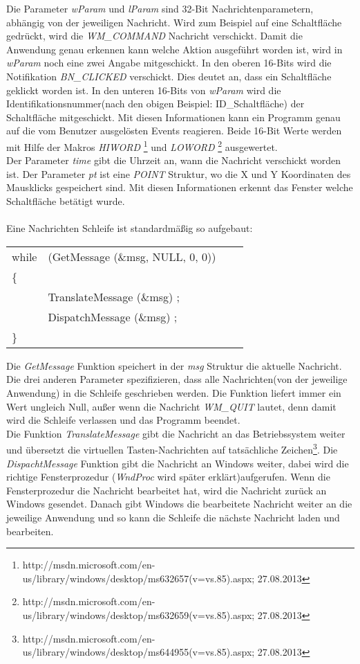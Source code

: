 Die Parameter \textit{wParam} und \textit{lParam} sind 32-Bit Nachrichtenparametern, abhängig von der jeweiligen Nachricht. Wird zum Beispiel auf eine Schaltfläche gedrückt, wird die \textit{WM\_COMMAND} Nachricht verschickt. Damit die Anwendung genau erkennen kann welche Aktion ausgeführt worden ist, wird in \textit{wParam} noch eine zwei Angabe mitgeschickt. In den oberen 16-Bits wird die Notifikation \textit{BN\_CLICKED} verschickt. Dies deutet an, dass ein Schaltfläche geklickt worden ist. In den unteren 16-Bits von \textit{wParam} wird die Identifikationsnummer(nach den obigen Beispiel: ID\_Schaltfläche) der Schaltfläche mitgeschickt. Mit diesen Informationen kann ein Programm genau auf die vom Benutzer ausgelösten Events reagieren. Beide 16-Bit Werte werden mit Hilfe der Makros \textit{HIWORD} \footnote{http://msdn.microsoft.com/en-us/library/windows/desktop/ms632657(v=vs.85).aspx; 27.08.2013} und \textit{LOWORD} \footnote{http://msdn.microsoft.com/en-us/library/windows/desktop/ms632659(v=vs.85).aspx; 27.08.2013} ausgewertet.\\

Der Parameter \textit{time} gibt die Uhrzeit an, wann die Nachricht verschickt worden ist. Der Parameter \textit{pt} ist eine \textit{POINT} Struktur, wo die X und Y Koordinaten des Mausklicks gespeichert sind. Mit diesen Informationen erkennt das Fenster welche Schaltfläche betätigt wurde.
\\\\
Eine Nachrichten Schleife ist standardmäßig so aufgebaut:

\begin{tabular}{llll}
while & (GetMessage (\&msg, NULL, 0, 0))\\
\{\\
     & TranslateMessage (\&msg) ;\\
     & DispatchMessage (\&msg) ;\\
\}\\
\end{tabular}

Die \textit{GetMessage} Funktion speichert in der \textit{msg} Struktur die aktuelle Nachricht. Die drei anderen Parameter spezifizieren, dass alle Nachrichten(von der jeweilige Anwendung) in die Schleife geschrieben werden. Die Funktion liefert immer ein Wert ungleich Null, außer wenn die Nachricht \textit{WM\_QUIT} lautet, denn damit wird die Schleife verlassen und das Programm beendet.
\\
Die Funktion \textit{TranslateMessage} gibt die Nachricht an das Betriebssystem weiter und übersetzt die virtuellen Tasten-Nachrichten auf tatsächliche Zeichen\footnote{http://msdn.microsoft.com/en-us/library/windows/desktop/ms644955(v=vs.85).aspx; 27.08.2013}. Die \textit{DispachtMessage} Funktion gibt die Nachricht an Windows weiter, dabei wird die richtige Fensterprozedur (\textit{WndProc} wird später erklärt)aufgerufen. Wenn die Fensterprozedur die Nachricht bearbeitet hat, wird die Nachricht zurück an Windows gesendet.  Danach gibt Windows die bearbeitete Nachricht weiter an die jeweilige Anwendung und so kann die Schleife die nächste Nachricht laden und bearbeiten.



